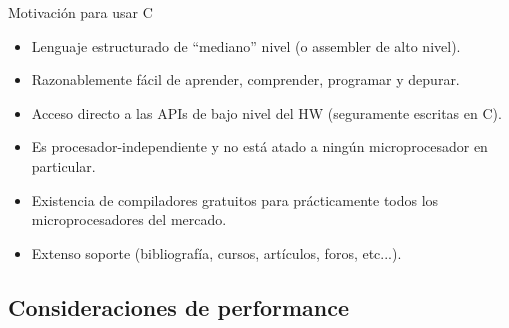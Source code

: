 \documentclass[aspectratio=169]{beamer}
\begin{document}
\begin{frame}{Motivación para usar C}
	\begin{itemize}
		\item Lenguaje estructurado de ``mediano'' nivel (o assembler de alto nivel).
		\vspace{10px}
		\item Razonablemente fácil de aprender, comprender, programar y depurar.
    \vspace{10px}		  
		\item Acceso directo a las APIs de bajo nivel del HW (seguramente escritas en C).
    \vspace{10px}		
    \item Es procesador-independiente y no está atado a ningún microprocesador en particular.	
    \vspace{10px}
		\item Existencia de compiladores gratuitos para prácticamente todos los microprocesadores del mercado.
		\vspace{10px}
		\item Extenso soporte (bibliografía, cursos, artículos, foros, etc...).
		\vspace{10px}
	\end{itemize}
\end{frame}


\subsection{Consideraciones de performance}
\end{document}
